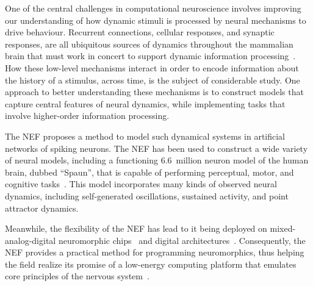 One of the central challenges in computational neuroscience involves improving our understanding of how dynamic stimuli is processed by neural mechanisms to drive behaviour.
Recurrent connections, cellular responses, and synaptic responses, are all ubiquitous sources of dynamics throughout the mammalian brain that must work in concert to support dynamic information processing~\citep{kandel2000principles}.
How these low-level mechanisms interact in order to encode information about the history of a stimulus, across time, is the subject of considerable study.
One approach to better understanding these mechanisms is to construct models that capture central features of neural dynamics, while implementing tasks that involve higher-order information processing.


The NEF proposes a method to model such dynamical systems in artificial networks of spiking neurons.
The NEF has been used to construct a wide variety of neural models, including a functioning 6.6~million neuron model of the human brain, dubbed ``Spaun'', that is capable of performing perceptual, motor, and cognitive tasks~\citep{eliasmith2012, choo2018}.
This model incorporates many kinds of observed neural dynamics, including self-generated oscillations, sustained activity, and point attractor dynamics.

Meanwhile, the flexibility of the NEF has lead to it being deployed on mixed-analog-digital neuromorphic chips~\citep{choudhary2012silicon, corradi2014, voelker2017iscas, voelker2017neuromorphic, braindrop2019} and digital architectures~\citep{bekolay2013, wang2014compact, mundy2015, knight2016, berzish2016, wang2017neuromorphic, blouw2018a}.
Consequently, the NEF provides a practical method for programming neuromorphics, thus helping the field realize its promise of a low-energy computing platform that emulates core principles of the nervous system~\citep{boahen2017neuromorph}.


